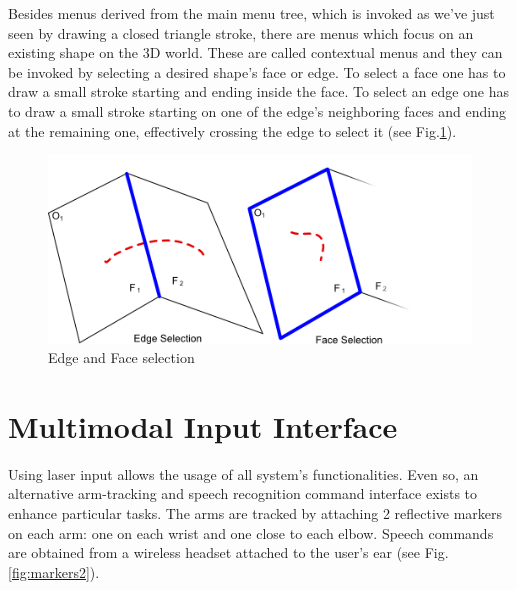 Besides menus derived from the main menu tree, which is invoked as we've just seen by drawing a closed triangle stroke,
there are menus which focus on an existing shape on the 3D world.
These are called contextual menus and they can be invoked by selecting a desired shape's face or edge.
To select a face one has to draw a small stroke starting and ending inside the face.
To select an edge one has to draw a small stroke starting on one of the edge's neighboring faces and ending at the remaining one,
effectively crossing the edge to select it (see Fig.\ref{fig:face-edge-selection}).


\begin{figure}[ht]
	\centering
		\includegraphics[scale=0.75]{gfx/face-edge-selection.png}
		\caption{Edge and Face selection}
	\label{fig:face-edge-selection}
\end{figure}



\section{Multimodal Input Interface}

Using laser input allows the usage of all system's functionalities.
Even so, an alternative arm-tracking and speech recognition command interface exists to enhance particular tasks.
The arms are tracked by attaching 2 reflective markers on each arm: one on each wrist and one close to each elbow.
Speech commands are obtained from a wireless headset attached to the user's ear (see Fig.\ref{fig:markers2}).


